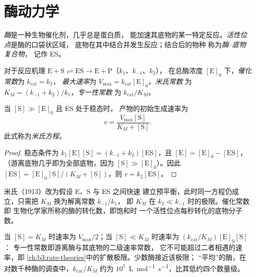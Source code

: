 \section{酶动力学}

\begin{definition}\label{def:b3:complex-kinetics:enzyme}
\emph{酶}是一种生物催化剂，几乎总是蛋白质，
能加速其底物的某一特定反应。\emph{活性位点}是酶的口袋状区域，
底物在其中结合并发生反应；结合后的物种
称为\emph{酶–底物复合物}，
记作 ES。
\end{definition}

\begin{definition}\label{def:b3:complex-kinetics:michaelis}
对于反应机理 $\mathrm{E + S \rightleftharpoons ES \to E + P}$（$k_1$、$k_{-1}$、$k_2$），
在总酶浓度 $[\mathrm E]_0$ 下，\emph{催化常数}为 $k_{\mathrm{cat}} = k_2$，
\emph{最大速率}为 $V_{\max} = k_{\mathrm{cat}}[\mathrm E]_0$，\emph{米氏常数}
为 $K_M = (k_{-1} + k_2)/k_1$，\emph{专一性常数}
为 $k_{\mathrm{cat}}/K_M$。
\end{definition}

\begin{theorem}[米氏方程]\label{thm:b3:complex-kinetics:michaelis-menten}
当 $[\mathrm S] \gg [\mathrm E]_0$ 且 ES 处于稳态时，
产物的初始生成速率为
\[
  v = \frac{V_{\max}[\mathrm S]}{K_M + [\mathrm S]} .
\]
此式称为\emph{米氏方程}。
\end{theorem}

\begin{proof}
稳态条件为 $k_1[\mathrm E][\mathrm S] = (k_{-1} + k_2)[\mathrm{ES}]$，且 $[\mathrm E] = [\mathrm E]_0 - [\mathrm{ES}]$，
（游离底物几乎即为全部底物，因为 $[\mathrm S] \gg [\mathrm E]_0$）。因此 $[\mathrm{ES}]
= [\mathrm E]_0[\mathrm S]/(K_M + [\mathrm S])$，则 $v = k_2[\mathrm{ES}]$。
\end{proof}

\begin{remark}
米氏（1913）改为假设 E、S 与 ES 之间快速
建立预平衡，此时同一方程仍成立，只需把 $K_M$ 换为解离常数 $k_{-1}/k_1$，
即 $K_M$ 在 $k_2 \ll k_{-1}$ 时的极限。催化常数即
生物化学家所称的酶的转化数，即饱和时
一个活性位点每秒转化的底物分子数。
\end{remark}

当 $[\mathrm S] = K_M$ 时速率为 $V_{\max}/2$；当 $[\mathrm S] \ll K_M$ 时速率为 $(k_{\mathrm{cat}}/K_M)[\mathrm E]_0[\mathrm S]$：
专一性常数即游离酶与其底物的二级速率常数，
它不可能超过二者相遇的速率，即
\cref{ch:b3:rate-theories}中的扩散极限。少数酶接近该极限；
“平均”的酶，在对数千种酶的调查中，$k_{\mathrm{cat}}/K_M$ 约为
$10^5$~\unit{L.mol^{-1}.s^{-1}}，比其低约四个数量级。

